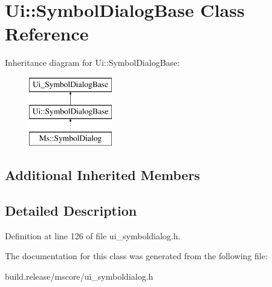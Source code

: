 \hypertarget{class_ui_1_1_symbol_dialog_base}{}\section{Ui\+:\+:Symbol\+Dialog\+Base Class Reference}
\label{class_ui_1_1_symbol_dialog_base}
Inheritance diagram for Ui\+:\+:Symbol\+Dialog\+Base\+:\begin{figure}[H]
\begin{center}
\leavevmode
\includegraphics[height=3.000000cm]{class_ui_1_1_symbol_dialog_base}
\end{center}
\end{figure}
\subsection*{Additional Inherited Members}


\subsection{Detailed Description}


Definition at line 126 of file ui\+\_\+symboldialog.\+h.



The documentation for this class was generated from the following file\+:\begin{DoxyCompactItemize}
\item 
build.\+release/mscore/ui\+\_\+symboldialog.\+h\end{DoxyCompactItemize}
